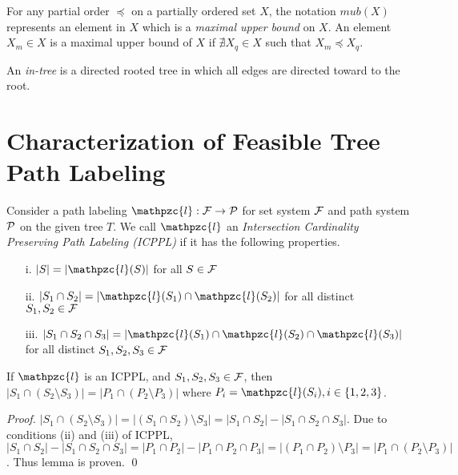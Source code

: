 \documentclass{fsttcs}
\def\cF{{\cal F}}
\def\cP{{\cal P}}
\def\cl{\mathpzc{l}}
\begin{document}
\noindent
For any partial order $\preccurlyeq$ on a partially ordered set $X$,  the notation $mub(X)$ represents an element in $X$ which is
a {\em maximal upper bound} on $X$.  An element $X_m \in X$ is a maximal upper bound of
$X$ if $\nexists X_q \in X$ such that $X_m
\preccurlyeq X_q$. 


\noindent
An {\em in-tree} is a directed rooted tree in which all edges are
directed toward to the root.

\section{Characterization of Feasible Tree Path  Labeling} 
\label{sec:feasible} 

Consider a path labeling $\cl: \cF \rightarrow \cP$ for set system $\cF$
and path system $\cP$ on the given tree $T$. We
call $\cl$ an {\em Intersection Cardinality Preserving Path Labeling
  (ICPPL)} if it has the following properties.

\begin{enumerate}
\item [i.]  $|S| = |\cl(S)|$ for all $S \in \cF$
\item [ii.] $|S_1 \cap S_2| = |\cl(S_1) \cap \cl(S_2)|$ for all
  distinct $S_1, S_2 \in \cF$
\item [iii.] $|S_1 \cap S_2 \cap S_3| = |\cl(S_1) \cap \cl(S_2) \cap
  \cl(S_3)|$ for all distinct  $S_1, S_2, S_3 \in \cF$
\end{enumerate}


\begin{lemma}
  \label{lem:setminuscard}
  If $\cl$ is an ICPPL, and $S_1, S_2, S_3 \in
  \cF$, then $|S_1 \cap (S_2 \setminus S_3)| = |P_1 \cap (P_2
   \setminus P_3)|$ where $P_i = \cl(S_i), i \in \{1, 2, 3\}$.
\end{lemma}
\begin{proof}
  $|S_1 \cap (S_2 \setminus S_3)| = |(S_1 \cap S_2) \setminus S_3| =
  |S_1 \cap S_2| - |S_1 \cap S_2 \cap S_3|$. Due to conditions (ii)
  and (iii) of ICPPL, $|S_1 \cap S_2| - |S_1 \cap S_2 \cap S_3| = |P_1
  \cap P_2| - |P_1 \cap P_2 \cap P_3| = |(P_1 \cap P_2) \setminus P_3|
  = |P_1 \cap (P_2 \setminus P_3)|$. Thus lemma is proven. \qed
\end{proof}
\end{document}
